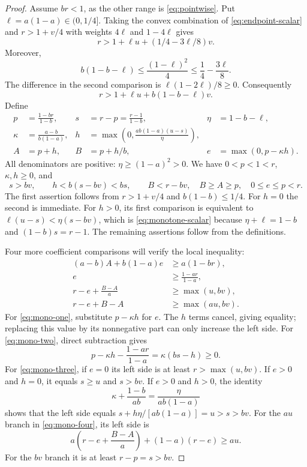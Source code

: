 \documentclass[11pt,a4paper]{article}
\theoremstyle{remark}
\begin{document}
\begin{proof}
Assume $br<1$, as the other range is \eqref{eq:pointwise}.
Put $\ell=a(1-a)\in(0,1/4]$.
Taking the convex combination of \eqref{eq:endpoint-scalar} and
$r>1+v/4$ with weights $4\ell$ and $1-4\ell$ gives
\[
 r>1+\ell u+(1/4-3\ell/8)v.
\]
Moreover,
\[
 b(1-b-\ell)\le\frac{(1-\ell)^2}{4}
 \le\frac14-\frac{3\ell}{8}.
\]
The difference in the second comparison is $\ell(1-2\ell)/8\ge0$.
Consequently
\begin{equation}\label{eq:monotone-scalar}
 r>1+\ell u+b(1-b-\ell)v.
\end{equation}
Define
\begin{align*}
 p&=\frac{1-br}{1-b},& s&=r-p=\frac{r-1}{1-b},&
 \eta&=1-b-\ell,\\
 \kappa&=\frac{a-b}{b(1-a)},&
 h&=\max\left(0,\frac{ab(1-a)(u-s)}{\eta}\right),\\
 A&=p+h,& B&=p+h/b,& e&=\max(0,p-\kappa h).
\end{align*}
All denominators are positive: $\eta\ge(1-a)^2>0$.
We have $0<p<1<r$, $\kappa,h\ge0$, and
\begin{equation}\label{eq:monotone-margin}
 s>bv,\qquad h<b(s-bv)<bs,\qquad
 B<r-bv,\quad B\ge A\ge p,\quad0\le e\le p<r.
\end{equation}
The first assertion follows from $r>1+v/4$ and $b(1-b)\le1/4$.
For $h=0$ the second is immediate. For $h>0$, its first comparison
is equivalent to
$\ell(u-s)<\eta(s-bv)$, which is \eqref{eq:monotone-scalar} because
$\eta+\ell=1-b$ and $(1-b)s=r-1$.
The remaining assertions follow from the definitions.

Four more coefficient comparisons will verify the local inequality:
\begin{align}
 (a-b)A+b(1-a)e&\ge a(1-br),\label{eq:mono-one}\\
 e&\ge\frac{1-ar}{1-a},\label{eq:mono-two}\\
 r-e+\frac{B-A}{a}&\ge\max(u,bv),\label{eq:mono-three}\\
 r-e+B-A&\ge\max(au,bv).\label{eq:mono-four}
\end{align}
For \eqref{eq:mono-one}, substitute $p-\kappa h$ for $e$.
The $h$ terms cancel, giving equality; replacing this value by its
nonnegative part can only increase the left side.
For \eqref{eq:mono-two}, direct subtraction gives
\[
 p-\kappa h-\frac{1-ar}{1-a}=\kappa(bs-h)\ge0.
\]
For \eqref{eq:mono-three}, if $e=0$ its left side is at least
$r>\max(u,bv)$. If $e>0$ and $h=0$, it equals $s\ge u$ and $s>bv$.
If $e>0$ and $h>0$, the identity
\[
 \kappa+\frac{1-b}{ab}=\frac{\eta}{ab(1-a)}
\]
shows that the left side equals
$s+h\eta/[ab(1-a)]=u>s>bv$.
For the $au$ branch in \eqref{eq:mono-four}, its left side is
\[
 a\left(r-e+\frac{B-A}{a}\right)+(1-a)(r-e)\ge au.
\]
For the $bv$ branch it is at least $r-p=s>bv$.


\end{proof}
\end{document}
